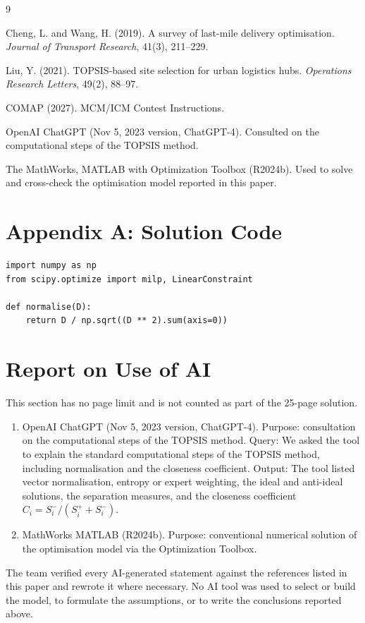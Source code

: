 \documentclass[12pt]{article}
\begin{document}
\begin{thebibliography}{9}

Cheng, L. and Wang, H. (2019). A survey of last-mile delivery optimisation.
\emph{Journal of Transport Research}, 41(3), 211--229.

Liu, Y. (2021). TOPSIS-based site selection for urban logistics hubs.
\emph{Operations Research Letters}, 49(2), 88--97.

COMAP (2027). MCM/ICM Contest Instructions.

OpenAI ChatGPT (Nov 5, 2023 version, ChatGPT-4). Consulted on the computational
steps of the TOPSIS method.

The MathWorks, MATLAB with Optimization Toolbox (R2024b). Used to solve and
cross-check the optimisation model reported in this paper.

\end{thebibliography}

\appendix
\section{Appendix A: Solution Code}

\begin{verbatim}
import numpy as np
from scipy.optimize import milp, LinearConstraint

def normalise(D):
    return D / np.sqrt((D ** 2).sum(axis=0))
\end{verbatim}

\clearpage
\section*{Report on Use of AI}

This section has no page limit and is not counted as part of the 25-page solution.

\begin{enumerate}
  \item OpenAI ChatGPT (Nov 5, 2023 version, ChatGPT-4). Purpose: consultation on
        the computational steps of the TOPSIS method.
        Query: We asked the tool to explain the standard computational steps of
        the TOPSIS method, including normalisation and the closeness coefficient.
        Output: The tool listed vector normalisation, entropy or expert weighting,
        the ideal and anti-ideal solutions, the separation measures, and the
        closeness coefficient $C_i = S_i^{-}/(S_i^{+}+S_i^{-})$.
  \item MathWorks MATLAB (R2024b). Purpose: conventional numerical solution of the
        optimisation model via the Optimization Toolbox.
\end{enumerate}

The team verified every AI-generated statement against the references listed in
this paper and rewrote it where necessary. No AI tool was used to select or build
the model, to formulate the assumptions, or to write the conclusions reported
above.

\end{document}
